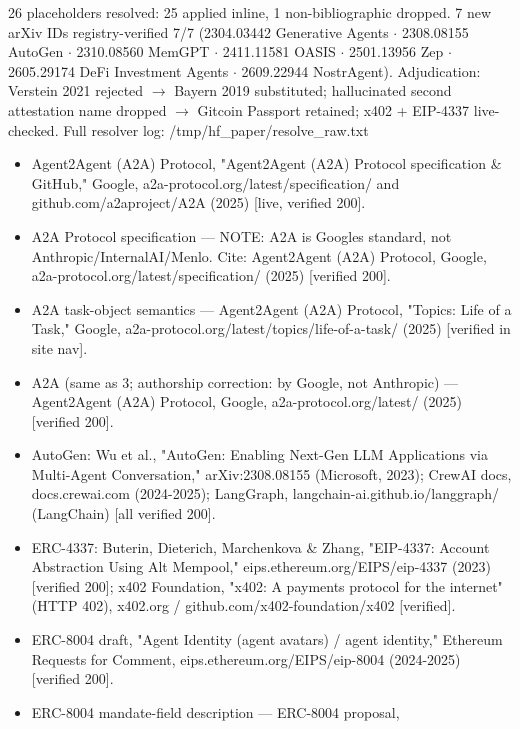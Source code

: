 \documentclass[
]{article}
\providecommand{\tightlist}{%
  \setlength{\itemsep}{0pt}\setlength{\parskip}{0pt}}
\begin{document}
26 placeholders resolved: 25 applied inline, 1 non-bibliographic
dropped. 7 new arXiv IDs registry-verified 7/7 (2304.03442 Generative
Agents $\cdot$ 2308.08155 AutoGen $\cdot$ 2310.08560 MemGPT $\cdot$ 2411.11581 OASIS $\cdot$
2501.13956 Zep $\cdot$ 2605.29174 DeFi Investment Agents $\cdot$ 2609.22944
NostrAgent). Adjudication: \textquotesingle Verstein
2021\textquotesingle{} rejected $\rightarrow$ Bayern 2019 substituted; hallucinated
second attestation name dropped $\rightarrow$ Gitcoin Passport retained; x402 +
EIP-4337 live-checked. Full resolver log:
/tmp/hf\_paper/resolve\_raw.txt

\begin{itemize}
\tightlist
\item
  Agent2Agent (A2A) Protocol, "Agent2Agent (A2A) Protocol specification
  \& GitHub," Google, a2a-protocol.org/latest/specification/ and
  github.com/a2aproject/A2A (2025) {[}live, verified 200{]}.
\item
  A2A Protocol specification --- NOTE: A2A is Google\textquotesingle s
  standard, not Anthropic/InternalAI/Menlo. Cite: Agent2Agent (A2A)
  Protocol, Google, a2a-protocol.org/latest/specification/ (2025)
  {[}verified 200{]}.
\item
  A2A task-object semantics --- Agent2Agent (A2A) Protocol, "Topics:
  Life of a Task," Google,
  a2a-protocol.org/latest/topics/life-of-a-task/ (2025) {[}verified in
  site nav{]}.
\item
  A2A (same as 3; authorship correction: by Google, not Anthropic) ---
  Agent2Agent (A2A) Protocol, Google, a2a-protocol.org/latest/ (2025)
  {[}verified 200{]}.
\item
  AutoGen: Wu et al., "AutoGen: Enabling Next-Gen LLM Applications via
  Multi-Agent Conversation," arXiv:2308.08155 (Microsoft, 2023); CrewAI
  docs, docs.crewai.com (2024-2025); LangGraph,
  langchain-ai.github.io/langgraph/ (LangChain) {[}all verified 200{]}.
\item
  ERC-4337: Buterin, Dieterich, Marchenkova \& Zhang, "EIP-4337: Account
  Abstraction Using Alt Mempool," eips.ethereum.org/EIPS/eip-4337 (2023)
  {[}verified 200{]}; x402 Foundation, "x402: A payments protocol for
  the internet" (HTTP 402), x402.org / github.com/x402-foundation/x402
  {[}verified{]}.
\item
  ERC-8004 draft, "Agent Identity (agent avatars) / agent identity,"
  Ethereum Requests for Comment, eips.ethereum.org/EIPS/eip-8004
  (2024-2025) {[}verified 200{]}.
\item
  ERC-8004 mandate-field description --- ERC-8004 proposal,

\end{itemize}
\end{document}
